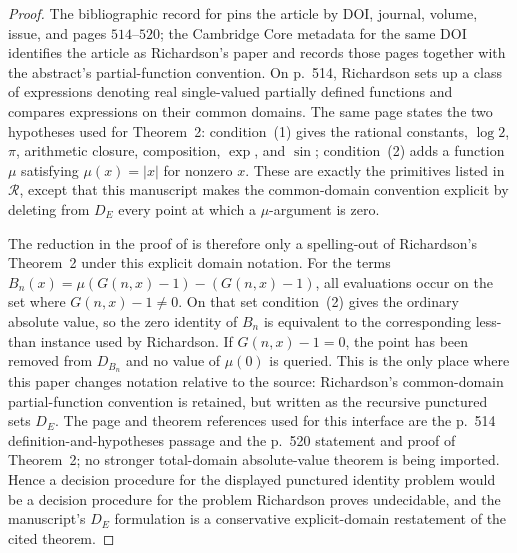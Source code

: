 \begin{proof}
The bibliographic record for \cite{Richardson1968} pins the article by DOI,
journal, volume, issue, and pages \(514\)--\(520\); the Cambridge Core metadata
for the same DOI identifies the article as Richardson's paper and records those
pages together with the abstract's partial-function convention.  On p.~514,
Richardson sets up a class of expressions denoting real single-valued partially
defined functions and compares expressions on their common domains.  The same
page states the two hypotheses used for Theorem~2: condition~(1) gives the
rational constants, \(\log2\), \(\pi\), arithmetic closure, composition,
\(\exp\), and \(\sin\); condition~(2) adds a function \(\mu\) satisfying
\(\mu(x)=|x|\) for nonzero \(x\).  These are exactly the primitives listed in
\(\mathcal R\), except that this manuscript makes the common-domain convention
explicit by deleting from \(D_E\) every point at which a \(\mu\)-argument is zero.

The reduction in the proof of
 is therefore only a spelling-out
of Richardson's Theorem~2 under this explicit domain notation.  For the terms
\(B_n(x)=\mu(G(n,x)-1)-(G(n,x)-1)\), all evaluations occur on the set where
\(G(n,x)-1\ne0\).  On that set condition~(2) gives the ordinary absolute value,
so the zero identity of \(B_n\) is equivalent to the corresponding less-than
instance used by Richardson.  If \(G(n,x)-1=0\), the point has been removed from
\(D_{B_n}\) and no value of \(\mu(0)\) is queried.  This is the only place where
this paper changes notation relative to the source: Richardson's common-domain
partial-function convention is retained, but written as the recursive punctured
sets \(D_E\).  The page and theorem references used for this interface are the
p.~514 definition-and-hypotheses passage and the p.~520 statement and proof of
Theorem~2; no stronger total-domain absolute-value theorem is being imported.
Hence a decision procedure for the displayed punctured identity problem would be
a decision procedure for the problem Richardson proves undecidable, and the
manuscript's \(D_E\) formulation is a conservative explicit-domain restatement of
the cited theorem.
\end{proof}

